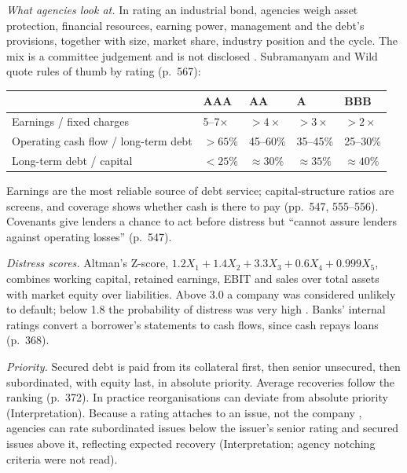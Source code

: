 \begin{qfmethod}\label{meth:corporate-credit-analysis}
 \emph{What agencies look at.} In rating an industrial bond, agencies weigh asset protection, financial resources, earning power, management and the debt's provisions, together with size, market share, industry position and the cycle. The mix is a committee judgement and is not disclosed \citep[p.~567]{financial-statement-analysis-2009}. Subramanyam and Wild quote rules of thumb by rating (p.~567):
\begin{center}\small
\begin{tabular}{@{}lllll@{}}
\toprule
 & AAA & AA & A & BBB \\
\midrule
Earnings / fixed charges & 5--7$\times$ & $>4\times$ & $>3\times$ & $>2\times$ \\
Operating cash flow / long-term debt & $>65\%$ & 45--60\% & 35--45\% & 25--30\% \\
Long-term debt / capital & $<25\%$ & $\approx30\%$ & $\approx35\%$ & $\approx40\%$ \\
\bottomrule
\end{tabular}
\end{center}
Earnings are the most reliable source of debt service; capital-structure ratios are screens, and coverage shows whether cash is there to pay (pp.~547, 555--556). Covenants give lenders a chance to act before distress but ``cannot assure lenders against operating losses'' (p.~547).

\emph{Distress scores.} Altman's Z-score, $1.2X_1+1.4X_2+3.3X_3+0.6X_4+0.999X_5$, combines working capital, retained earnings, EBIT and sales over total assets with market equity over liabilities. Above 3.0 a company was considered unlikely to default; below 1.8 the probability of distress was very high \citep[pp.~368--369]{risk-management-financial-institutions-2023}. Banks' internal ratings convert a borrower's statements to cash flows, since cash repays loans (p.~368).

\emph{Priority.} Secured debt is paid from its collateral first, then senior unsecured, then subordinated, with equity last, in absolute priority. Average recoveries follow the ranking (p.~372). In practice reorganisations can deviate from absolute priority (Interpretation). Because a rating attaches to an issue, not the company \citep[p.~367 n.~1]{risk-management-financial-institutions-2023}, agencies can rate subordinated issues below the issuer's senior rating and secured issues above it, reflecting expected recovery (Interpretation; agency notching criteria were not read).


\end{qfmethod}
